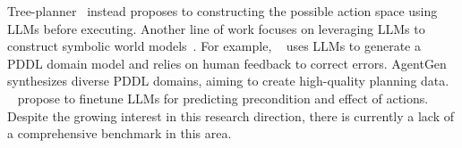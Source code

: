Tree-planner~\cite{hu2023tree} instead proposes to constructing the possible action space using LLMs before executing.
Another line of work focuses on leveraging LLMs to construct symbolic world models~\citep{oswald2024large,silver2024generalized,smirnov2024generating,zhu2024language,wang2023bytesized32,wong2023word,vafa2024evaluating}. 
For example, ~\citet{guan2023leveraging} uses LLMs to generate a PDDL domain model and relies on human feedback to correct errors. 
AgentGen~\citep{hu2024agentgen} synthesizes diverse PDDL domains, aiming to create high-quality planning data. 
~\citet{xie2024making} propose to finetune LLMs for predicting precondition and effect of actions.
% 
Despite the growing interest in this research direction, there is currently a lack of a comprehensive benchmark in this area. 


